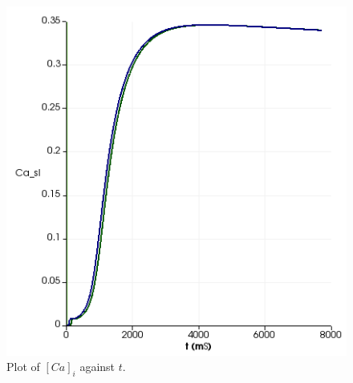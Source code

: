 \documentclass[12pt,a4paper]{article}
\begin{document}
\begin{figure}
   \includegraphics[width=1\linewidth]{Casl8000} 
    \caption{Plot of $[Ca]_i$ against $t$.}
    \label{fig:4}
\end{figure}
\end{document}
